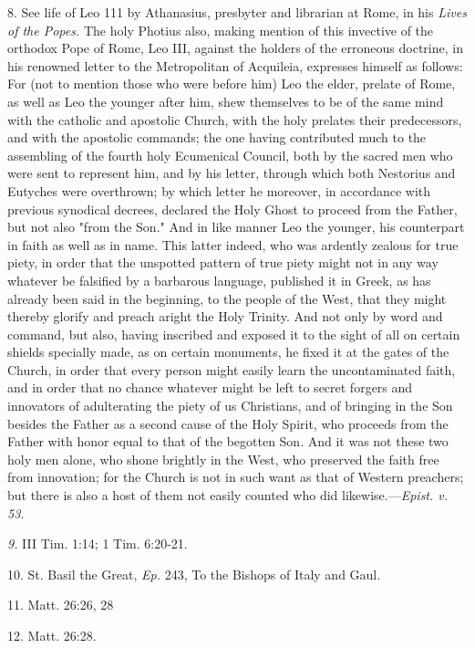 8. See life of Leo 111 by Athanasius, presbyter and librarian at Rome,
in his \emph{Lives of the Popes.} The holy Photius also, making mention
of this invective of the orthodox Pope of Rome, Leo III, against the
holders of the erroneous doctrine, in his renowned letter to the
Metropolitan of Acquileia, expresses himself as follows:
\textquotesingle For (not to mention those who were before him) Leo the
elder, prelate of Rome, as well as Leo the younger after him, shew
themselves to be of the same mind with the catholic and apostolic
Church, with the holy prelates their predecessors, and with the
apostolic commands; the one having contributed much to the assembling of
the fourth holy Ecumenical Council, both by the sacred men who were sent
to represent him, and by his letter, through which both Nestorius and
Eutyches were overthrown; by which letter he moreover, in accordance
with previous synodical decrees, declared the Holy Ghost to proceed from
the Father, but not also "from the Son." And in like manner Leo the
younger, his counterpart in faith as well as in name. This latter
indeed, who was ardently zealous for true piety, in order that the
unspotted pattern of true piety might not in any way whatever be
falsified by a barbarous language, published it in Greek, as has already
been said in the beginning, to the people of the West, that they might
thereby glorify and preach aright the Holy Trinity. And not only by word
and command, but also, having inscribed and exposed it to the sight of
all on certain shields specially made, as on certain monuments, he fixed
it at the gates of the Church, in order that every person might easily
learn the uncontaminated faith, and in order that no chance whatever
might be left to secret forgers and innovators of adulterating the piety
of us Christians, and of bringing in the Son besides the Father as a
second cause of the Holy Spirit, who proceeds from the Father with honor
equal to that of the begotten Son. And it was not these two holy men
alone, who shone brightly in the West, who preserved the faith free from
innovation; for the Church is not in such want as that of Western
preachers; but there is also a host of them not easily counted who did
likewise.\textquotesingle---\emph{Epist. v. 53.}

\emph{9.} III Tim. 1:14; 1 Tim. 6:20-21.

10. St. Basil the Great, \emph{Ep.} 243, To the Bishops of Italy and
Gaul.

11. Matt. 26:26, 28

12. Matt. 26:28.


